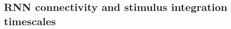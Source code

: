 \documentclass[5p,twocolumn,authoryear]{elsarticle}
\begin{document}





\clearpage
\subsection{RNN connectivity and stimulus integration timescales}
\label{sec_supp_eigen}

\end{document}
